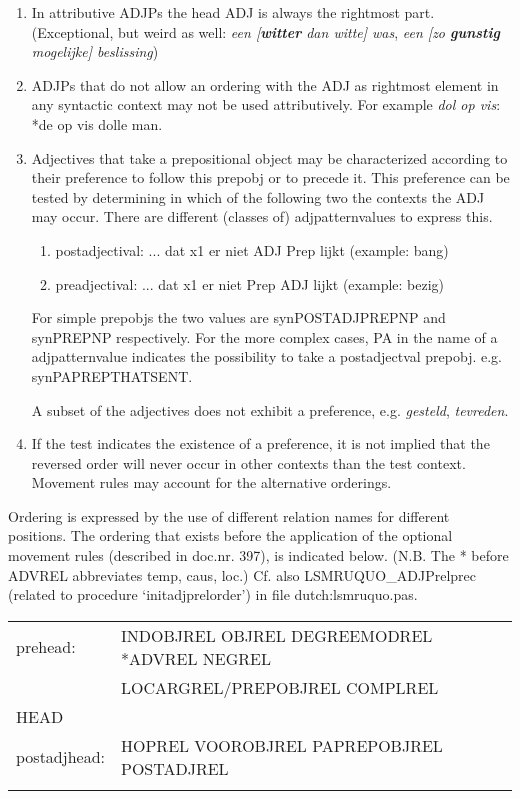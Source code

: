 \begin{enumerate}
  \item In attributive ADJPs the head ADJ is always the rightmost part. 
(Exceptional, but weird as well: {\em een [{\bf witter} dan witte] was},
{\em een [zo {\bf gunstig} mogelijke] beslissing})
  \item ADJPs that do not allow an ordering with the ADJ as rightmost element 
in any syntactic context may not be used attributively. For example 
{\em dol op vis}: *de op vis dolle man.

\item Adjectives that take a prepositional object
may be characterized according to their preference to follow this prepobj 
or to precede it. This preference can be tested by 
determining in which of the following two the contexts the ADJ may occur. There 
are different (classes of) adjpatternvalues to express this.


\begin{enumerate}
  \item 
postadjectival: ... dat x1 er niet ADJ Prep lijkt (example: bang)
  \item
preadjectival: ... dat x1 er niet Prep ADJ lijkt (example: bezig)
\end{enumerate}

For simple prepobjs the two values are synPOSTADJPREPNP and synPREPNP 
respectively. 
For the more complex cases, PA in the  name of a adjpatternvalue indicates 
the possibility to take a postadjectval prepobj. e.g. synPAPREPTHATSENT.

A subset of the adjectives does not exhibit a preference, e.g. {\em gesteld},
{\em tevreden}.
\item
If the test indicates the existence of 
a preference, it is not implied that the reversed order 
will never occur in other contexts than the test context.  
Movement rules may account for the alternative orderings.

\end{enumerate}
Ordering is expressed by the use of different relation names for different
positions. 
The ordering that exists before the application of the optional movement rules 
(described in doc.nr. 397), is indicated below.
(N.B. The * before ADVREL abbreviates temp, caus, loc.) Cf. also
LSMRUQUO\_ADJPrelprec (related to procedure `initadjprelorder') in file 
dutch:lsmruquo.pas.
\mbox{}\\ 

\begin{tabular}{ll}

prehead: &  INDOBJREL OBJREL DEGREEMODREL *ADVREL NEGREL \\
         &   LOCARGREL/PREPOBJREL  COMPLREL \\

HEAD& \\

postadjhead:& HOPREL VOOROBJREL PAPREPOBJREL POSTADJREL\\
&\\
\end{tabular}


